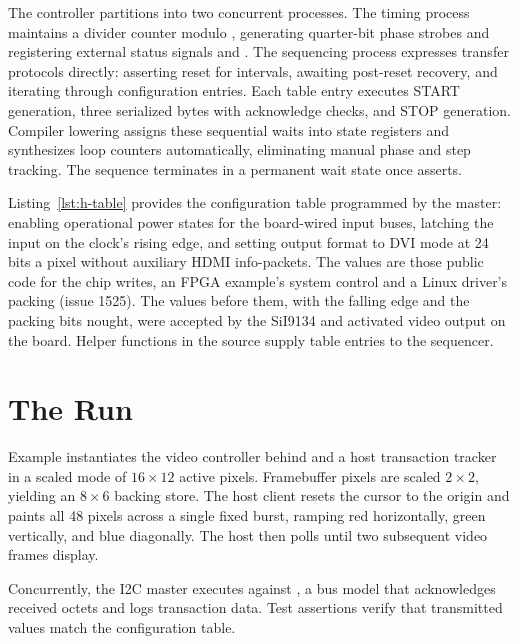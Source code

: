 \documentclass[journal,9pt]{IEEEtran}
\newcommand{\hdmipart}[3]{%
}
\begin{document}
The controller partitions into two concurrent processes. The timing
process maintains a divider counter modulo , generating
quarter-bit phase strobes and registering external status signals
 and . The sequencing process expresses transfer
protocols directly: asserting reset for  intervals, awaiting
post-reset recovery, and iterating through configuration entries. Each
table entry executes START generation, three serialized bytes with
acknowledge checks, and STOP generation. Compiler lowering assigns these
sequential waits into state registers and synthesizes loop counters
automatically, eliminating manual phase and step tracking. The sequence
terminates in a permanent wait state once  asserts.

\hdmipart{i2cstate}{The master's registers.}{lst:h-i2cstate}

\hdmipart{i2c}{The master's two processes.}{lst:h-i2c}

Listing~\ref{lst:h-table} provides the configuration table programmed by
the master: enabling operational power states for the board-wired input
buses, latching the input on the clock's rising edge, and setting output
format to DVI mode at 24 bits a pixel without auxiliary HDMI
info-packets. The values are those public code for the chip writes, an
FPGA example's system control and a Linux driver's packing (issue 1525).
The values before them, with the falling edge and the packing bits
nought, were accepted by the SiI9134 and activated video output on the
board. Helper functions in the source supply table entries to the
sequencer.

\hdmipart{table}{The chip's configuration.}{lst:h-table}

\section{The Run}
\label{sec:h-run}

Example  instantiates the video controller behind
 and a host transaction tracker in a scaled mode
of $16 \times 12$ active pixels. Framebuffer pixels are scaled $2 \times 2$,
yielding an $8 \times 6$ backing store. The host client resets the cursor
to the origin and paints all 48 pixels across a single fixed burst, ramping
red horizontally, green vertically, and blue diagonally. The host then polls
 until two subsequent video frames display.

Concurrently, the I2C master executes against , a bus model
that acknowledges received octets and logs transaction data. Test
assertions verify that transmitted values match the configuration table.
\end{document}
